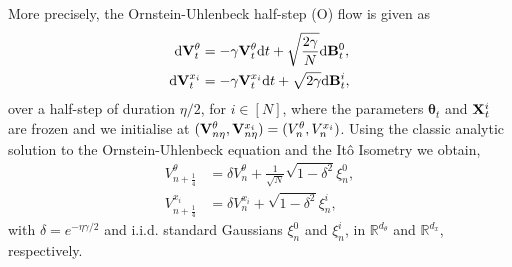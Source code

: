 More precisely, the Ornstein-Uhlenbeck half-step (O) flow is given as
\begin{align*}
\mathrm{d} {\mathbf V}_t^\theta &= -\gamma {\mathbf V}_t^\theta \mathrm{d}t + \sqrt{\frac{2\gamma}{N}} \mathrm{d}{\mathbf B}_t^0,\\
\mathrm{d} {\mathbf V}_t^{x_i} &= - \gamma {\mathbf V}_t^{x_i} \mathrm{d} t + \sqrt{2\gamma}\mathrm{d}{\mathbf B}_t^i,
\end{align*}
over a half-step of duration $\eta/2$, for $i\in[N]$, where the parameters $\bm{\theta}_t$ and ${\mathbf X}_t^i$ are frozen and we initialise at $({\mathbf V}_{n\eta}^\theta, {\mathbf V}_{n\eta}^{x_i})= (V_n^\theta, V_n^{x_i})$. Using the classic analytic solution to the Ornstein-Uhlenbeck equation and the It\^{o} Isometry we obtain,
\begin{equation}
\begin{aligned}
V_{n+\frac{1}{4}}^\theta &= \delta V_n^\theta + \frac{1}{\sqrt{N}} \sqrt{1-\delta^2} \xi_n^0,\\
V_{n+\frac{1}{4}}^{x_i} &= \delta V_n^{x_i} + \sqrt{1-\delta^2} \xi_n^i,
\end{aligned}\tag{O}
\end{equation}
with $\delta=e^{-\eta\gamma/2}$ and i.i.d. standard Gaussians $\xi_n^0$ and $\xi_n^i$, in $\mathbb{R}^{d_\theta}$ and $\mathbb{R}^{d_x}$, respectively.

